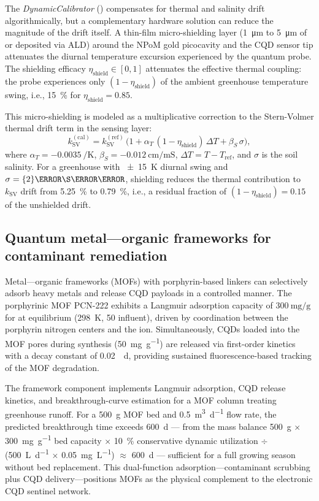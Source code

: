 \documentclass[11pt,a4paper]{article}
\begin{document}
The \textit{DynamicCalibrator} () compensates for thermal and salinity drift algorithmically, but a complementary hardware solution can reduce the magnitude of the drift itself. A thin-film micro-shielding layer (\qty{1}{\micro\meter} to \qty{5}{\micro\meter} of  or  deposited via ALD) around the NPoM gold picocavity and the CQD sensor tip attenuates the diurnal temperature excursion experienced by the quantum probe. The shielding efficacy $\eta_{\mathrm{shield}} \in [0,1]$ attenuates the effective thermal coupling: the probe experiences only $(1 - \eta_{\mathrm{shield}})$ of the ambient greenhouse temperature swing, i.e., \qty{15}{\percent} for $\eta_{\mathrm{shield}} = \num{0.85}$.

This micro-shielding is modeled as a multiplicative correction to the Stern-Volmer thermal drift term in the sensing layer:
\[
k_{\mathrm{SV}}^{\mathrm{(cal)}} = k_{\mathrm{SV}}^{\mathrm{(ref)}} \,
\bigl(1 + \alpha_T \,(1 - \eta_{\mathrm{shield}})\,\Delta T + \beta_S \,\sigma\bigr),
\]
where $\alpha_T = \qty{-0.0035}{\per\K}$, $\beta_S = \qty{-0.012}{\cm\per\milli\siemens}$, $\Delta T = T - T_{\mathrm{ref}}$, and $\sigma$ is the soil salinity. For a greenhouse with \qty{\pm 15}{\K} diurnal swing and $\sigma = \qty{2}{\milli\S\per\cm}$, shielding reduces the thermal contribution to $k_{\mathrm{SV}}$ drift from \qty{5.25}{\percent} to \qty{0.79}{\percent}, i.e., a residual fraction of $(1 - \eta_{\mathrm{shield}}) = 0.15$ of the unshielded drift.

\subsection{Quantum metal---organic frameworks for contaminant remediation}
\label{SI-sec:mof}

Metal---organic frameworks (MOFs) with porphyrin-based linkers can selectively adsorb heavy metals and release CQD payloads in a controlled manner. The porphyrinic MOF PCN-222 exhibits a Langmuir adsorption capacity of $\qty{300}{\mg\per\g}$ for  at equilibrium (\qty{298}{\K}, \qty{50}{\ppb} influent), driven by coordination between the porphyrin nitrogen centers and the  ion. Simultaneously, CQDs loaded into the MOF pores during synthesis (\qty{50}{\mg\per\g}) are released via first-order kinetics with a decay constant of \qty{0.02}{\per\day}, providing sustained fluorescence-based tracking of the MOF degradation.

The framework component implements Langmuir adsorption, CQD release kinetics, and breakthrough-curve estimation for a MOF column treating greenhouse runoff. For a \qty{500}{\g} MOF bed and \qty{0.5}{\m\cubed\per\day} flow rate, the predicted  breakthrough time exceeds \qty{600}{\day} --- from the mass balance \qty{500}{\g} $\times$ \qty{300}{\mg\per\g} bed capacity $\times$ \qty{10}{\percent} conservative dynamic utilization $\div$ (\qty{500}{\L\per\day} $\times$ \qty{0.05}{\mg\per\L}) $\approx$ \qty{600}{\day} --- sufficient for a full growing season without bed replacement. This dual-function adsorption---contaminant scrubbing plus CQD delivery---positions MOFs as the physical complement to the electronic CQD sentinel network.
\end{document}
